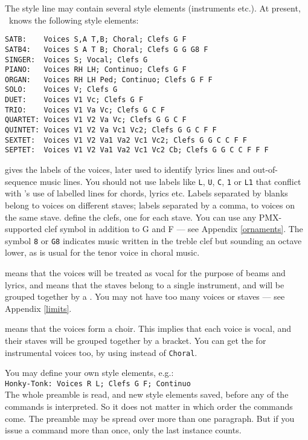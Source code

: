 \documentclass[11pt]{article}
\begin{document}
The style line may contain several style elements (instruments etc.).
At present, \MTx\ knows the following style elements:
\begin{verbatim}
SATB:    Voices S,A T,B; Choral; Clefs G F
SATB4:   Voices S A T B; Choral; Clefs G G G8 F
SINGER:  Voices S; Vocal; Clefs G
PIANO:   Voices RH LH; Continuo; Clefs G F
ORGAN:   Voices RH LH Ped; Continuo; Clefs G F F
SOLO:    Voices V; Clefs G
DUET:    Voices V1 Vc; Clefs G F
TRIO:    Voices V1 Va Vc; Clefs G C F
QUARTET: Voices V1 V2 Va Vc; Clefs G G C F
QUINTET: Voices V1 V2 Va Vc1 Vc2; Clefs G G C F F
SEXTET:  Voices V1 V2 Va1 Va2 Vc1 Vc2; Clefs G G C C F F
SEPTET:  Voices V1 V2 Va1 Va2 Vc1 Vc2 Cb; Clefs G G C C F F F
\end{verbatim}
  gives the labels of the voices, later used to identify 
lyrics lines and out-of-sequence music lines.  You should not use labels
like \texttt{L}, \texttt{U}, \texttt{C}, \texttt{1} or \texttt{L1} 
that conflict with \MTx's use of labelled lines for chords, lyrics etc.
Labels separated by
blanks belong to voices on different staves; labels separated by a comma, 
to voices on the same stave.   define the clefs, one for each
stave.  You can use any PMX-supported clef symbol in addition to G and F
--- see Appendix \ref{ornaments}.
The symbol \verb'8' or \verb'G8' indicates music written in the treble clef 
 but sounding an octave lower, as is usual for the tenor voice in 
choral music.

 means that the voices will be treated as vocal for the 
purpose of beams and lyrics, and  means that the staves 
belong to 
a single instrument, and will be grouped together by a . 
You may not have too many voices or staves --- see Appendix \ref{limits}.

 means that the voices form a choir.  This implies that each
voice is vocal, and their staves will be grouped together by a bracket.  
You can get the  for instrumental voices too, by using
 instead of \texttt{Choral}.

You may define your own style elements, 
e.g.: \\

\texttt{Honky-Tonk: Voices R L; Clefs G F; Continuo} \\

The whole preamble is read, and new style elements saved, before any of the 
commands is interpreted.  So it does not matter in which order the commands 
come.  The preamble may be spread over more than one paragraph.   
But if you issue a command more than once, only the last instance counts. 
\end{document}
